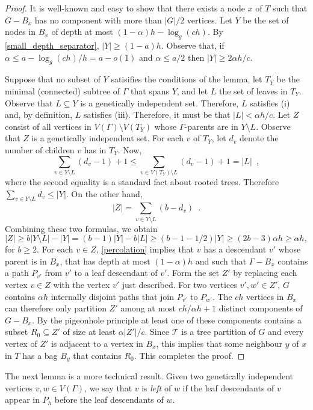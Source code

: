 \documentclass{patmorin}
\newcommand{\defin}[1]{\emph{\color{brightmaroon}#1}}
\begin{document}
\begin{proof}
  It is well-known and easy to show that there exists a node $x$ of $T$ such that $G-B_x$ has no component with more than $|G|/2$ vertices.  Let $Y$ be the set of nodes in $B_x$ of depth at most $(1-\alpha)h-\log_g(ch)$. By \cref{small_depth_separator}, $|Y|\ge (1-a)h$.  Observe that, if $\alpha \le a-\log_g(ch)/h = a-o(1)$ and $\alpha \le a/2$ then $|Y|\ge 2\alpha h/c$.


  Suppose that no subset of $Y$ satisifies the conditions of the lemma, let $T_Y$ be the minimal (connected) subtree of $\Gamma$ that spans $Y$, and let $L$ the set of leaves in $T_Y$.  Observe that $L\subseteq Y$ is a genetically independent set. Therefore, $L$ satisfies (i) and, by definition, $L$ satisfies (iii).  Therefore, it must be that $|L|<\alpha h/c$.  Let $Z$ consist of all vertices in $V(\Gamma)\setminus V(T_Y)$ whose $\Gamma$-parents are in $Y\setminus L$.   Observe that $Z$ is a genetically independent set. For each $v$ of $T_Y$, let $d_v$ denote the number of children $v$ has in $T_Y$.  Now,
  \[
     \sum_{v\in Y\setminus L} (d_v-1) + 1 
     \le \sum_{v\in V(T_Y)\setminus L} (d_v-1)+1
     = |L| \enspace ,
  \]
  where the second equality is a standard fact about rooted trees.
  Therefore $\sum_{v\in Y\setminus L} {d_v} \le |Y|$.  On the other hand,
  \[
    |Z| = \sum_{v\in Y\setminus L} (b-d_v) \enspace .
  \]
  Combining these two formulas, we obtain
  \[
    |Z| \ge b|Y\setminus L| - |Y| = (b-1)|Y| - b|L| \ge (b-1-1/2)|Y|
    \ge (2b - 3)\alpha h \ge \alpha h ,
  \]
  for $b\ge 2$.
  For each $v\in Z$, \cref{percolation} implies that $v$ has a descendant $v'$ whose parent is in $B_x$, that has depth at most $(1-\alpha)h$ and such that $\Gamma-B_x$ contains a path $P_{v'}$ from $v'$ to a leaf descendant of $v'$.  Form the set $Z'$ by replacing each vertex $v\in Z$ with the vertex $v'$ just described.  For two vertices $v',w'\in Z'$, $G$ contains $\alpha h$ internally disjoint paths that join $P_{v'}$ to $P_{w'}$.  The $ch$ vertices in $B_x$ can therefore only partition $Z'$ among at most $ch/\alpha h+1$ distinct components of $G-B_x$.  By the pigeonhole principle at least one of these components contains a subset $R_0\subseteq Z'$ of size at least $\alpha|Z'|/c$. Since $\mathcal{T}$ is a tree partition of $G$ and every vertex of $Z'$ is adjacent to a vertex in $B_x$, this implies that some neighbour $y$ of $x$ in $T$ has a bag $B_y$ that contains $R_0$.  This completes the proof.
\end{proof}

The next lemma is a more technical result.  Given two genetically independent vertices $v,w\in V(\Gamma)$, we say that $v$ is \defin{left} of $w$ if the leaf descendants of $v$ appear in $P_h$ before the leaf descendants of $w$.
\end{document}
